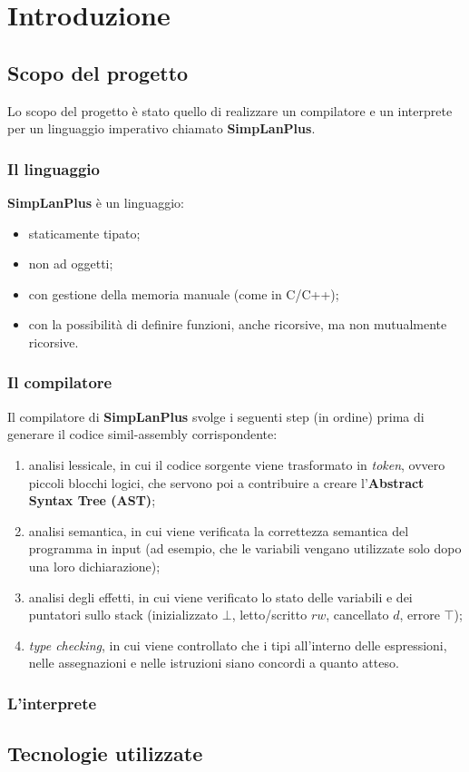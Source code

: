\documentclass[../report.tex]{subfiles}
\begin{document}
\chapter{Introduzione}\label{c:introduzione}
\section{Scopo del progetto}\label{s:scopo-progetto}
Lo scopo del progetto è stato quello di realizzare un compilatore e un interprete per un linguaggio imperativo chiamato \textbf{SimpLanPlus}.

\subsection{Il linguaggio}
\textbf{SimpLanPlus} è un linguaggio:
\begin{itemize}
    \item staticamente tipato;
    \item non ad oggetti;
    \item con gestione della memoria manuale (come in C/C++);
    \item con la possibilità di definire funzioni, anche ricorsive, ma non mutualmente ricorsive.
\end{itemize}

\subsection{Il compilatore}
Il compilatore di \textbf{SimpLanPlus} svolge i seguenti step (in ordine) prima di generare il codice simil-assembly corrispondente:
\begin{enumerate}
    \item analisi lessicale, in cui il codice sorgente viene trasformato in \textit{token}, ovvero piccoli blocchi logici, che servono poi a contribuire a creare l'\textbf{Abstract Syntax Tree (AST)};
    \item analisi semantica, in cui viene verificata la correttezza semantica del programma in input (ad esempio, che le variabili vengano utilizzate solo dopo una loro dichiarazione);
    \item analisi degli effetti, in cui viene verificato lo stato delle variabili e dei puntatori sullo stack (inizializzato $\bot$, letto/scritto $rw$, cancellato $d$, errore $\top$);
    \item \textit{type checking}, in cui viene controllato che i tipi all'interno delle espressioni, nelle assegnazioni e nelle istruzioni siano concordi a quanto atteso.
\end{enumerate}

\subsection{L'interprete}

\section{Tecnologie utilizzate}\label{s:teconologie-utilizzate}
\end{document}
